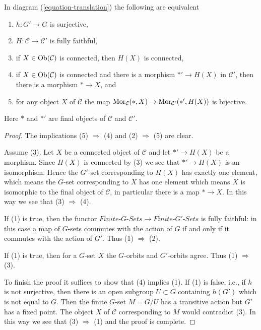 \begin{lemma}
\label{lemma-functoriality-galois-surjective}
In diagram (\ref{equation-translation}) the following are equivalent
\begin{enumerate}
\item $h : G' \to G$ is surjective,
\item $H : \mathcal{C} \to \mathcal{C}'$ is fully faithful,
\item if $X \in \mathop{\mathrm{Ob}}\nolimits(\mathcal{C})$ is connected, then $H(X)$ is connected,
\item if $X \in \mathop{\mathrm{Ob}}\nolimits(\mathcal{C})$ is connected and there is
a morphism $*' \to H(X)$ in $\mathcal{C}'$, then
there is a morphism $* \to X$, and
\item for any object $X$ of $\mathcal{C}$ the map
$\mathop{\mathrm{Mor}}\nolimits_\mathcal{C}(*, X) \to \mathop{\mathrm{Mor}}\nolimits_{\mathcal{C}'}(*', H(X))$
is bijective.
\end{enumerate}
Here $*$ and $*'$ are final objects of $\mathcal{C}$ and $\mathcal{C}'$.
\end{lemma}

\begin{proof}
The implications (5) $\Rightarrow$ (4) and (2) $\Rightarrow$ (5) are clear.

\medskip\noindent
Assume (3). Let $X$ be a connected object of $\mathcal{C}$ and let
$*' \to H(X)$ be a morphism. Since $H(X)$ is connected by (3)
we see that $*' \to H(X)$ is an isomorphism. Hence the $G'$-set
corresponding to $H(X)$ has exactly one element, which means the
$G$-set corresponding to $X$ has one element which means $X$ is
isomorphic to the final object of $\mathcal{C}$, in particular
there is a map $* \to X$. In this way we see that (3) $\Rightarrow$ (4).

\medskip\noindent
If (1) is true, then the functor
$\textit{Finite-}G\textit{-Sets} \to \textit{Finite-}G'\textit{-Sets}$
is fully faithful: in this case a map of $G$-sets commutes with the
action of $G$ if and only if it commutes with the action of $G'$.
Thus (1) $\Rightarrow$ (2).

\medskip\noindent
If (1) is true, then for a $G$-set $X$ the $G$-orbits and $G'$-orbits
agree. Thus (1) $\Rightarrow$ (3).

\medskip\noindent
To finish the proof it suffices to show that (4) implies (1).
If (1) is false, i.e., if $h$ is not surjective, then there is
an open subgroup $U \subset G$ containing $h(G')$ which is not
equal to $G$. Then the finite $G$-set $M = G/U$ has a transitive
action but $G'$ has a fixed point. The object $X$ of $\mathcal{C}$
corresponding to $M$ would contradict (3). In this way we see that
(3) $\Rightarrow$ (1) and the proof is complete.
\end{proof}

